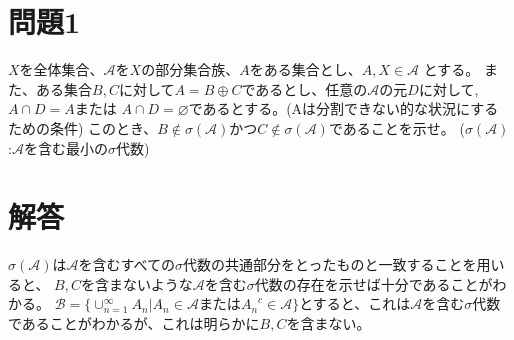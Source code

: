 \documentclass[12pt]{jsarticle}
\theoremstyle{definition}
\begin{document}
    \section*{問題1}
    $X$を全体集合、$\mathcal{A}$を$X$の部分集合族、$A$をある集合とし、$A,X \in \mathcal{A}$ とする。
    また、ある集合$B,C$に対して$A=B\oplus C$であるとし、任意の$\mathcal{A}$の元$D$に対して,$A \cap D=A$または
    $A \cap D=\varnothing$であるとする。(Aは分割できない的な状況にするための条件)
    このとき、$B \notin \sigma ( \mathcal{A})$かつ$C \notin \sigma ( \mathcal{A})$であることを示せ。
    ($\sigma ( \mathcal{A})$:$ \mathcal{A}$を含む最小の$\sigma$代数)
    \section*{解答}
    $\sigma ( \mathcal{A})$は$\mathcal{A}$を含むすべての$\sigma$代数の共通部分をとったものと一致することを用いると、
    $B,C$を含まないような$\mathcal{A}$を含む$\sigma$代数の存在を示せば十分であることがわかる。
    $\mathcal{B}=\lbrace\cup_{n=1}^\infty A_n\lvert A_n\in \mathcal{A}$または${A_n}^c\in \mathcal{A}\rbrace$とすると、これは$\mathcal{A}$を含む$\sigma$代数
    であることがわかるが、これは明らかに$B,C$を含まない。
\end{document}
